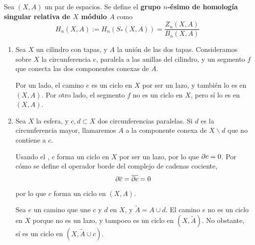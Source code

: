 \begin{definition}
Sea $(X,A)$ un par de espacios. Se define el \textbf{grupo $n$-ésimo de
homología singular relativa de $X$ módulo $A$} como
\[H_n(X,A):=H_n(S_*(X,A))=\frac{Z_n(X,A)}{B_n(X,A)}\]
\end{definition}


\begin{example}
\begin{enumerate}
\item Sea $X$ un cilindro con tapas, y $A$ la unión de las dos tapas.
Consideramos sobre $X$ la circunferencia $e$, paralela a las anillas del
cilindro, y un segmento $f$ que conecta las dos componentes conexas de $A$.

Por un lado, el camino $e$ es un ciclo en $X$ por ser un lazo, y también lo
es en $(X,A)$. Por otro lado, el segmento $f$ no es un ciclo en $X$, pero
sí lo es en $(X,A)$.
\item Sea $X$ la esfera, y $c,d \subset X$ dos circunferencias paralelas. Si
$d$ es la circunferencia mayor, llamaremos $A$ a la componente conexa de $X
\backslash d$ que no contiene a $c$.

Usando el , $c$ forma un ciclo en $X$ por ser un
lazo, por lo que $\partial c=0$. Por cómo se define el operador borde del complejo
de cadenas cociente,
\[\partial\overline c=\overline{\partial c}=0\]
por lo que $c$ forma un ciclo en $(X,A)$.

Sea $e$ un camino que une $c$ y $d$ en $X$, y $\tilde{A}=A\cup d$. El camino
$e$ no es un ciclo en $X$ porque no es un lazo, y tampoco es un ciclo en
$(X,\tilde{A})$. No obstante, sí es un ciclo en $(X,\tilde{A}\cup c)$.
\end{enumerate}
\end{example}

